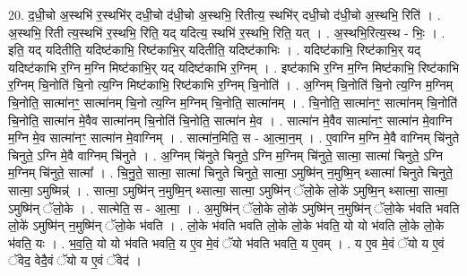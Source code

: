 \documentclass[17pt]{extarticle}
\begin{document}
20. द॒धी॒चो अ॒स्थभि॑ र॒स्थभि॑र् दधी॒चो द॑धी॒चो अ॒स्थभि॒ रितीत्य॒ स्थभि॑र् दधी॒चो द॑धी॒चो अ॒स्थभि॒ रिति॑ । . अ॒स्थभि॒ रिती त्य॒स्थभि॑ र॒स्थभि॒ रिति॒ यद् यदित्य॒ स्थभि॑ र॒स्थभि॒ रिति॒ यत् । . अ॒स्थभि॒रित्य॒स्थ - भिः॒ । . इति॒ यद् यदितीति॒ यदिष्ट॑काभि॒ रिष्ट॑काभि॒र् यदितीति॒ यदिष्ट॑काभिः । . यदिष्ट॑काभि॒ रिष्ट॑काभि॒र् यद् यदिष्ट॑काभि र॒ग्नि म॒ग्नि मिष्ट॑काभि॒र् यद् यदिष्ट॑काभि र॒ग्निम् । . इष्ट॑काभि र॒ग्नि म॒ग्नि मिष्ट॑काभि॒ रिष्ट॑काभि र॒ग्निम् चि॒नोति॑ चि॒नो त्य॒ग्नि मिष्ट॑काभि॒ रिष्ट॑काभि र॒ग्निम् चि॒नोति॑ । . अ॒ग्निम् चि॒नोति॑ चि॒नो त्य॒ग्नि म॒ग्निम् चि॒नोति॒ सात्मा॑नꣳ॒॒ सात्मा॑नम् चि॒नो त्य॒ग्नि म॒ग्निम् चि॒नोति॒ सात्मा॑नम् । . चि॒नोति॒ सात्मा॑नꣳ॒॒ सात्मा॑नम् चि॒नोति॑ चि॒नोति॒ सात्मा॑न मे॒वैव सात्मा॑नम् चि॒नोति॑ चि॒नोति॒ सात्मा॑न मे॒व । . सात्मा॑न मे॒वैव सात्मा॑नꣳ॒॒ सात्मा॑न मे॒वाग्नि म॒ग्नि मे॒व सात्मा॑नꣳ॒॒ सात्मा॑न मे॒वाग्निम् । . सात्मा॑न॒मिति॒ स - आ॒त्मा॒न॒म् । . ए॒वाग्नि म॒ग्नि मे॒वै वाग्निम् चि॑नुते चिनुते॒ ऽग्नि मे॒वै वाग्निम् चि॑नुते । . अ॒ग्निम् चि॑नुते चिनुते॒ ऽग्नि म॒ग्निम् चि॑नुते॒ सात्मा॒ सात्मा॑ चिनुते॒ ऽग्नि म॒ग्निम् चि॑नुते॒ सात्मा᳚ । . चि॒नु॒ते॒ सात्मा॒ सात्मा॑ चिनुते चिनुते॒ सात्मा॒ ऽमुष्मि॑न् न॒मुष्मि॒न् थ्सात्मा॑ चिनुते चिनुते॒ सात्मा॒ ऽमुष्मिन्न्॑ । . सात्मा॒ ऽमुष्मि॑न् न॒मुष्मि॒न् थ्सात्मा॒ सात्मा॒ ऽमुष्मि॑न् ॅलो॒के लो॒के॑ ऽमुष्मि॒न् थ्सात्मा॒ सात्मा॒ ऽमुष्मि॑न् ॅलो॒के । . सात्मेति॒ स - आ॒त्मा॒ । . अ॒मुष्मि॑न् ॅलो॒के लो॒के॑ ऽमुष्मि॑न् न॒मुष्मि॑न् ॅलो॒के भ॑वति भवति लो॒के॑ ऽमुष्मि॑न् न॒मुष्मि॑न् ॅलो॒के भ॑वति । . लो॒के भ॑वति भवति लो॒के लो॒के भ॑वति॒ यो यो भ॑वति लो॒के लो॒के भ॑वति॒ यः । . भ॒व॒ति॒ यो यो भ॑वति भवति॒ य ए॒व मे॒वं ॅयो भ॑वति भवति॒ य ए॒वम् । . य ए॒व मे॒वं ॅयो य ए॒वं ॅवेद॒ वेदै॒वं ॅयो य ए॒वं ॅवेद॑ । \newline
\end{document}
